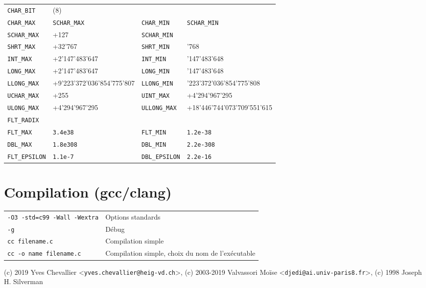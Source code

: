 \documentclass{article}
\newcommand{\cd}{\lstinline}
\begin{document}
\begin{multicols*}{3}
\begin{tabularx}{\linewidth}{
  >{\hsize=0.5\hsize}X%
  >{\hsize=1.5\hsize}X%
  >{\hsize=0.5\hsize}X%
  >{\hsize=1.5\hsize}X%
  }
  \cd{CHAR_BIT}  & (8) &   & \\
  \cd{CHAR_MAX} & \cd{SCHAR_MAX} & \cd{CHAR_MIN} & \cd{SCHAR_MIN} \\
  \cd{SCHAR_MAX} & +127 & \cd{SCHAR_MIN} & -127 \\
  \cd{SHRT_MAX} & +32'767 & \cd{SHRT_MIN} & -32'768 \\
  \cd{INT_MAX} & +2'147'483'647 & \cd{INT_MIN} & -2'147'483'648 \\
  \cd{LONG_MAX} & +2'147'483'647 & \cd{LONG_MIN} & -2'147'483'648 \\
  \cd{LLONG_MAX} & +9'223'372'036'854'775'807 & \cd{LLONG_MIN} & -9'223'372'036'854'775'808 \\
  \cd{UCHAR_MAX} & +255 & \cd{UINT_MAX} & +4'294'967'295 \\
  \cd{ULONG_MAX} & +4'294'967'295 & \cd{ULLONG_MAX} & +18'446'744'073'709'551'615 \\
  \cd{FLT_RADIX} & 2 & & \rule{0pt}{2ex} \\
  \cd{FLT_MAX} & \cd{3.4e38} & \cd{FLT_MIN} & \cd{1.2e-38} \\
  \cd{DBL_MAX} & \cd{1.8e308} & \cd{DBL_MIN} & \cd{2.2e-308} \\
  \cd{FLT_EPSILON} & \cd{1.1e-7} & \cd{DBL_EPSILON} & \cd{2.2e-16}
\end{tabularx}

\section*{Compilation (gcc/clang)}
\begin{tabularx}{\linewidth}{Xl}
  \texttt{-O3 -std=c99 -Wall -Wextra} & Options standards \\
  \texttt{-g} & Débug \\
  \texttt{cc filename.c} & Compilation simple \\
  \texttt{cc -o name filename.c} & Compilation simple, choix du nom de l'exécutable \\
\end{tabularx}

\vfill
{
  \color{gray}
  \tiny
  (c) 2019 Yves Chevallier <\texttt{yves.chevallier@heig-vd.ch}>, (c) 2003-2019 Valvassori Moïse <\texttt{djedi@ai.univ-paris8.fr}>, (c) 1998 Joseph H. Silverman
}
\end{multicols*}
\end{document}
